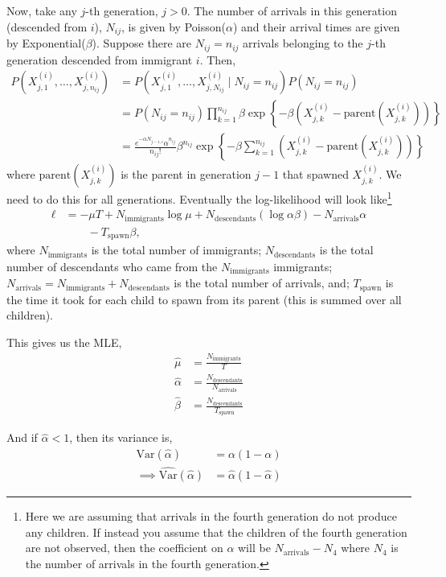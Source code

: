 \documentclass[11pt]{article}
\newcommand{\Var}{\text{Var}}
\begin{document}
\begin{enumerate}
Now, take any $j$-th generation, $j > 0$. The number of arrivals in this generation (descended from $i$), $N_{ij}$, is given by Poisson($\alpha$) and their arrival times are given by Exponential($\beta$). Suppose there are $N_{ij} = n_{ij}$ arrivals belonging to the $j$-th generation descended from immigrant $i$. Then,
\begin{align*}
	P(X_{j,1}^{(i)}, \dots, X_{j, n_{ij}}^{(i)}) &= P(X_{j,1}^{(i)}, \dots, X_{j, N_{ij}}^{(i)} \mid N_{ij} = n_{ij}) P(N_{ij} = n_{ij}) \\
	&= P(N_{ij} = n_{ij}) \prod_{k=1}^{n_{ij}} \beta \exp \left\{ -\beta \left(X_{j, k}^{(i)} - \text{parent}(X_{j, k}^{(i)}) \right) \right\} \\
	&= \frac{e^{-\alpha N_{j-1,i}} \alpha^{n_{ij}}}{n_{ij}!} \beta^{n_{ij}} \exp \left\{ -\beta \sum_{k=1}^{n_{ij}} \left(X_{j, k}^{(i)} - \text{parent}(X_{j, k}^{(i)}) \right) \right\}
\end{align*}
where $\text{parent}(X_{j, k}^{(i)})$ is the parent in generation $j-1$ that spawned $X_{j, k}^{(i)}$. We need to do this for all generations. Eventually the log-likelihood will look like\footnote{Here we are assuming that arrivals in the fourth generation do not produce any children. If instead you assume that the children of the fourth generation are not observed, then the coefficient on $\alpha$ will be $N_{\text{arrivals}} - N_4$ where $N_4$ is the number of arrivals in the fourth generation.}
\begin{align*}
	\ell &= -\mu T + N_{\text{immigrants}} \log \mu + N_{\text{descendants}} (\log \alpha \beta) - N_{\text{arrivals}} \alpha \\
	&\qquad - T_{\text{spawn}} \beta,
\end{align*}
where $N_{\text{immigrants}}$ is the total number of immigrants; $N_{\text{descendants}}$ is the total number of descendants who came from the $N_{\text{immigrants}}$ immigrants; $N_{\text{arrivals}} = N_{\text{immigrants}} + N_{\text{descendants}}$ is the total number of arrivals, and; $T_{\text{spawn}}$ is the time it took for each child to spawn from its parent (this is summed over all children).

This gives us the MLE,
\begin{align*}
	\widehat{\mu} &= \frac{N_{\text{immigrants}}}{T} \\
	\widehat{\alpha} &= \frac{N_{\text{descendants}}}{N_{\text{arrivals}}} \\
	\widehat{\beta} &= \frac{N_{\text{descendants}}}{T_{\text{spawn}}}
\end{align*}

And if $\widehat{\alpha} < 1$, then its variance is,
\begin{align*}
	\Var(\widehat{\alpha}) &= \alpha (1 - \alpha) \\
	\implies \widehat{\Var}(\widehat{\alpha}) &= \widehat{\alpha} (1 - \widehat{\alpha})
\end{align*}

\end{enumerate}



%
%
\end{document}
